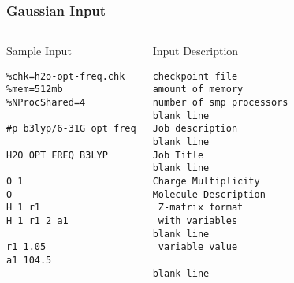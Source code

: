 \documentclass[slidestop,mathserif,compress,xcolor=svgnames]{beamer}
\begin{document}
\begin{frame}[fragile]
\frametitle{\small Gaussian Input}
\footnotesize{
\begin{columns}
\column{6.5cm}
\begin{block}{Sample Input}
\begin{verbatim}
%chk=h2o-opt-freq.chk
%mem=512mb
%NProcShared=4

#p b3lyp/6-31G opt freq

H2O OPT FREQ B3LYP

0 1
O
H 1 r1
H 1 r1 2 a1

r1 1.05 
a1 104.5

\end{verbatim}
\end{block}
\column{5cm}
{\color{tigersblue}
\begin{alertblock}{Input Description}
\begin{verbatim}
checkpoint file
amount of memory
number of smp processors
blank line
Job description
blank line
Job Title
blank line
Charge Multiplicity
Molecule Description
 Z-matrix format 
 with variables
blank line
 variable value

blank line
\end{verbatim}
\end{alertblock}
}
\end{columns}
}
\end{frame}
\end{document}
